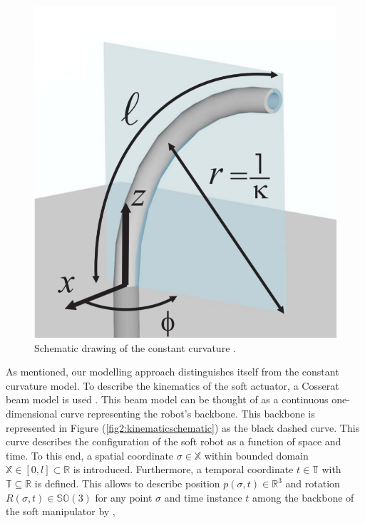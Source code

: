 \begin{minipage}{\linewidth}
\begin{minipage}{0.45\linewidth}
\begin{figure}[H]
              \includegraphics[width=\linewidth]{Figures/Chapter2/ccapproach.png}
              \caption{Schematic drawing of the constant curvature \cite{ccapproach}.}
              \label{fig2:ccapproach}
          \end{figure}
      \end{minipage}
  \end{minipage}


As mentioned, our modelling approach distinguishes itself from the constant curvature model. To describe the kinematics of the soft actuator, a Cosserat beam model is used \cite{Boyer2019}. This beam model can be thought of as a continuous one-dimensional curve representing the robot's backbone. This backbone is represented in Figure (\ref{fig2:kinematicschematic}) as the black dashed curve. This curve describes the configuration of the soft robot as a function of space and time. To this end, a spatial coordinate  $\sigma \in \mathbb{X}$ within bounded domain $\mathbb{X} \in [0,l] \subset \mathbb{R}$ is introduced. Furthermore, a temporal coordinate $t \in  \mathbb{T}$ with $\mathbb{T} \subseteq \mathbb{R}$ is defined. This allows to describe position $p(\sigma,t) \in \mathbb{R}^3$ and rotation $R(\sigma,t) \in \mathbb{SO}(3)$ for any point $\sigma$ and time instance $t$ among the backbone of the soft manipulator by \cite{Caasenbrood2020},



